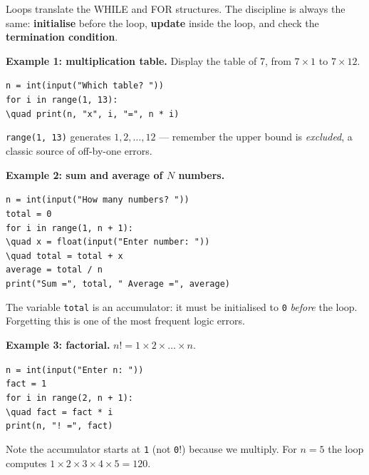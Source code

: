 \documentclass[11pt]{article}
\newcommand{\cle}[1]{{\popxbold\color{popdark}#1}}
\begin{document}
Loops translate the WHILE and FOR structures. The discipline is always the same: \textbf{initialise} before the loop, \textbf{update} inside the loop, and check the \textbf{termination condition}.

\textbf{Example 1: multiplication table.} Display the table of 7, from $7\times1$ to $7\times12$.

\begin{exemplebox}
\begin{flushleft}
\texttt{n = int(input("Which table? "))}\\
\texttt{for i in range(1, 13):}\\
\texttt{\textbackslash{}quad print(n, "x", i, "=", n * i)}
\end{flushleft}
\texttt{range(1, 13)} generates $1, 2, \dots, 12$ --- remember the upper bound is \emph{excluded}, a classic source of off-by-one errors.
\end{exemplebox}

\textbf{Example 2: sum and average of $N$ numbers.}

\begin{exemplebox}
\begin{flushleft}
\texttt{n = int(input("How many numbers? "))}\\
\texttt{total = 0}\\
\texttt{for i in range(1, n + 1):}\\
\texttt{\textbackslash{}quad x = float(input("Enter number: "))}\\
\texttt{\textbackslash{}quad total = total + x}\\
\texttt{average = total / n}\\
\texttt{print("Sum =", total, " Average =", average)}
\end{flushleft}
The variable \texttt{total} is an \cle{accumulator}: it must be initialised to \texttt{0} \emph{before} the loop. Forgetting this is one of the most frequent logic errors.
\end{exemplebox}

\textbf{Example 3: factorial.} $n! = 1 \times 2 \times \dots \times n$.

\begin{exemplebox}[Factorial]
\begin{flushleft}
\texttt{n = int(input("Enter n: "))}\\
\texttt{fact = 1}\\
\texttt{for i in range(2, n + 1):}\\
\texttt{\textbackslash{}quad fact = fact * i}\\
\texttt{print(n, "! =", fact)}
\end{flushleft}
Note the accumulator starts at \texttt{1} (not \texttt{0}!) because we multiply. For $n = 5$ the loop computes $1\times2\times3\times4\times5 = 120$.
\end{exemplebox}
\end{document}
